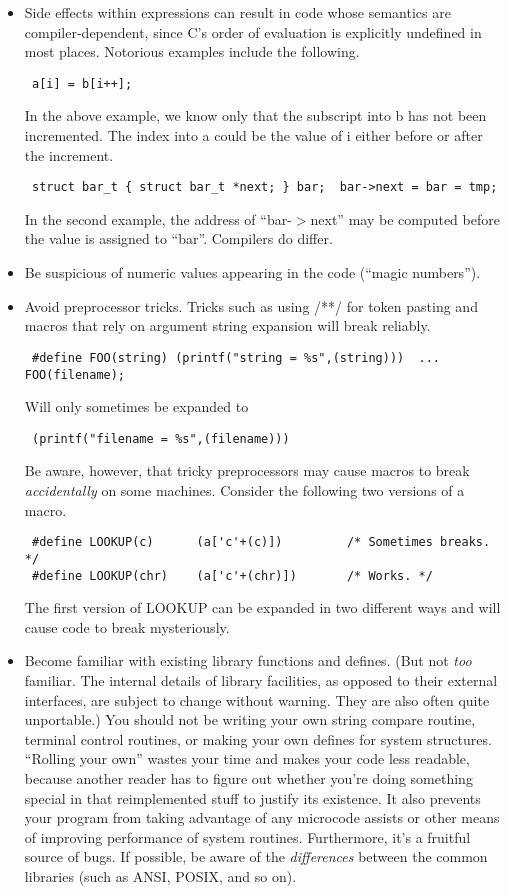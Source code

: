 \begin{itemize}
\item Side effects within expressions can result in code whose semantics are
compiler-dependent, since C's order of evaluation is explicitly undefined in
most places. Notorious  examples include the following. 
\begin{verbatim}
 a[i] = b[i++];
\end{verbatim}
In the above example, we know only that the subscript into b has not been
incremented.  The index into a could be the value of i either before or after
the increment. 
\begin{verbatim}
 struct bar_t { struct bar_t *next; } bar;  bar->next = bar = tmp; 
\end{verbatim}
In the second example, the address of ``bar-$>$next'' may be computed before the
value is assigned to ``bar''. Compilers do differ. 

\item Be suspicious of numeric values appearing in the code (``magic numbers'').

\item Avoid preprocessor tricks. Tricks such as using /**/ for token pasting and
macros that rely on argument string expansion will break reliably. 
\begin{verbatim}
 #define FOO(string) (printf("string = %s",(string)))  ...  FOO(filename); 
\end{verbatim}
Will only sometimes be expanded to 
\begin{verbatim}
 (printf("filename = %s",(filename))) 
\end{verbatim}
Be aware, however, that tricky preprocessors may cause macros to break
{\em accidentally} on  some machines. Consider the following two versions
of a macro.
\begin{verbatim}
 #define LOOKUP(c)      (a['c'+(c)])         /* Sometimes breaks. */
 #define LOOKUP(chr)    (a['c'+(chr)])       /* Works. */
\end{verbatim}
The first version of LOOKUP can be expanded in two different ways and will
cause code to break mysteriously. 

\item Become familiar with existing library functions and defines.
(But not {\em too} familiar. The internal details of library facilities,
as opposed to their external interfaces, are subject to change without
warning. They are also often quite unportable.) You should not be writing
your own string compare routine, terminal control routines, or making your
own defines for system structures. ``Rolling your own'' wastes your time
and makes your code less readable, because another reader has to figure
out whether you're doing something special in that reimplemented stuff to
justify its existence. It also prevents your program from taking advantage
of any microcode assists or other means of improving performance of system
routines. Furthermore, it's a fruitful source of bugs. If possible, be aware
of the {\em differences} between the
common libraries (such as ANSI, POSIX, and so on). 


\end{itemize}
